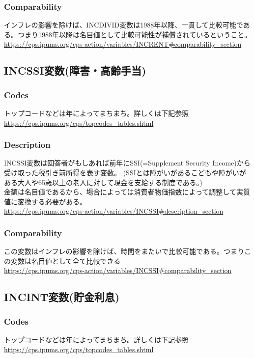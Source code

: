 \documentclass{jsarticle}
\begin{document}
\subsubsection{Comparability}
インフレの影響を除けば、INCDIVID変数は1988年以降、一貫して比較可能である。つまり1988年以降は名目値として比較可能性が補償されているということ。\\
\url{https://cps.ipums.org/cps-action/variables/INCRENT#comparability_section}

\subsection{INCSSI変数(障害・高齢手当)}

\subsubsection{Codes}
トップコードなどは年によってまちまち。詳しくは下記参照\\
\url{https://cps.ipums.org/cps/topcodes_tables.shtml}

\subsubsection{Description}
INCSSI変数は回答者がもしあれば前年にSSI(=Supplement Security Income)から受け取った税引き前所得を表す変数。
(SSIとは障がいがあるこどもや障がいがある大人や65歳以上の老人に対して現金を支給する制度である。)\\
  
金額は名目値であるから、場合によっては消費者物価指数によって調整して実質値に変換する必要がある。\\
\url{https://cps.ipums.org/cps-action/variables/INCSSI#description_section}

\subsubsection{Comparability}
この変数はインフレの影響を除けば、時間をまたいで比較可能である。つまりこの変数は名目値として全て比較できる\\
\url{https://cps.ipums.org/cps-action/variables/INCSSI#comparability_section}

\subsection{INCINT変数(貯金利息)}

\subsubsection{Codes}
トップコードなどは年によってまちまち。詳しくは下記参照\\
\url{https://cps.ipums.org/cps/topcodes_tables.shtml}
\end{document}
